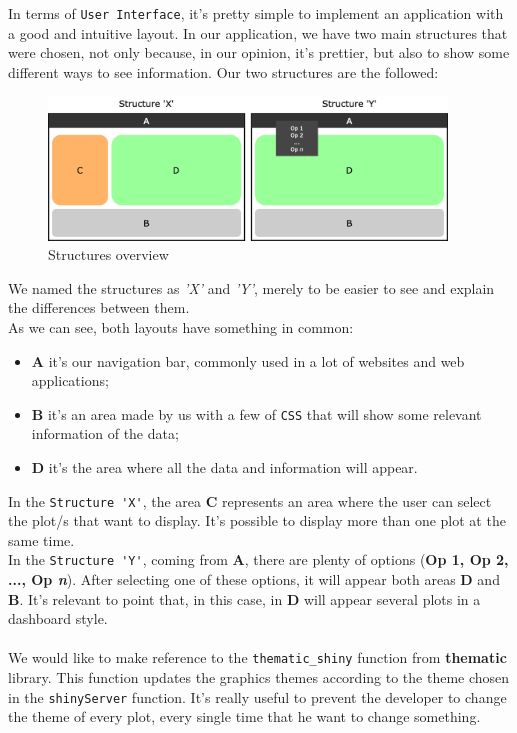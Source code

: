 In terms of \verb!User Interface!, it's pretty simple to implement an application with a good and intuitive layout. In our application, we have two main structures that were chosen, not only because, in our opinion, it's prettier, but also to show some different ways to see information. Our two structures are the followed: \\

\begin{figure}[H]
\centering
\includegraphics[width=300pt,trim=10 0 0 -10mm]{images/coiso.png}
\caption{Structures overview}
\label{fig:overview}
\end{figure}

We named the structures as \textit{'X'} and \textit{'Y'}, merely to be easier to see and explain the differences between them.\\
As we can see, both layouts have something in common: \\
\begin{itemize}
    \item \textbf{A} it's our navigation bar, commonly used in a lot of websites and web applications;
    \item \textbf{B} it's an area made by us with a few of \verb!CSS! that will show some relevant information of the data;
    \item \textbf{D} it's the area where all the data and information will appear.  
\end{itemize}

In the \verb!Structure 'X'!, the area \textbf{C} represents an area where the user can select the plot/s that want to display. It's possible to display more than one plot at the same time. \\ 
In the \verb!Structure 'Y'!, coming from \textbf{A}, there are plenty of options (\textbf{Op 1, Op 2, ..., Op \textit{n}}). After selecting one of these options, it will appear both areas \textbf{D} and  \textbf{B}. It's relevant to point that, in this case, in \textbf{D}  will appear several plots in a dashboard style.\\
\\
We would like to make reference to the \texttt{thematic\_shiny} function from \textbf{thematic} library. This function updates the graphics themes according to the theme chosen in the \texttt{shinyServer} function. It's really useful to prevent the developer to change the theme of every plot, every single time that he want to change something.